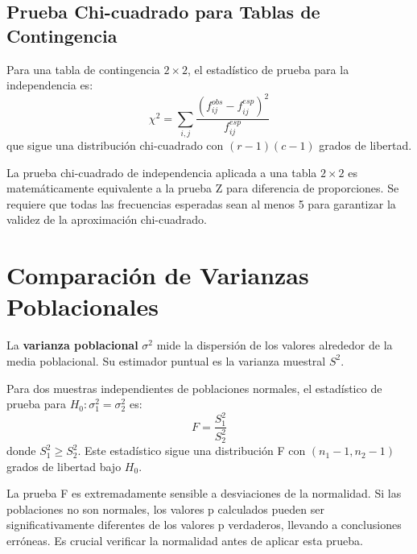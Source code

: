 \subsection{Prueba Chi-cuadrado para Tablas de Contingencia}

\begin{theorem}
Para una tabla de contingencia $2 \times 2$, el estadístico de prueba para la independencia es:
\[
\chi^2 = \sum_{i,j} \frac{(f_{ij}^{obs} - f_{ij}^{esp})^2}{f_{ij}^{esp}}
\]
que sigue una distribución chi-cuadrado con $(r-1)(c-1)$ grados de libertad.
\end{theorem}

\begin{remark}
La prueba chi-cuadrado de independencia aplicada a una tabla $2 \times 2$ es matemáticamente equivalente a la prueba Z para diferencia de proporciones. Se requiere que todas las frecuencias esperadas sean al menos 5 para garantizar la validez de la aproximación chi-cuadrado.
\end{remark}

\section{Comparación de Varianzas Poblacionales}

\begin{definition}
La \textbf{varianza poblacional} $\sigma^2$ mide la dispersión de los valores alrededor de la media poblacional. Su estimador puntual es la varianza muestral $S^2$.
\end{definition}

\begin{theorem}
Para dos muestras independientes de poblaciones normales, el estadístico de prueba para $H_0: \sigma_1^2 = \sigma_2^2$ es:
\[
F = \frac{S_1^2}{S_2^2}
\]
donde $S_1^2 \geq S_2^2$. Este estadístico sigue una distribución F con $(n_1-1, n_2-1)$ grados de libertad bajo $H_0$.
\end{theorem}

\begin{remark}
La prueba F es extremadamente sensible a desviaciones de la normalidad. Si las poblaciones no son normales, los valores p calculados pueden ser significativamente diferentes de los valores p verdaderos, llevando a conclusiones erróneas. Es crucial verificar la normalidad antes de aplicar esta prueba.
\end{remark}

